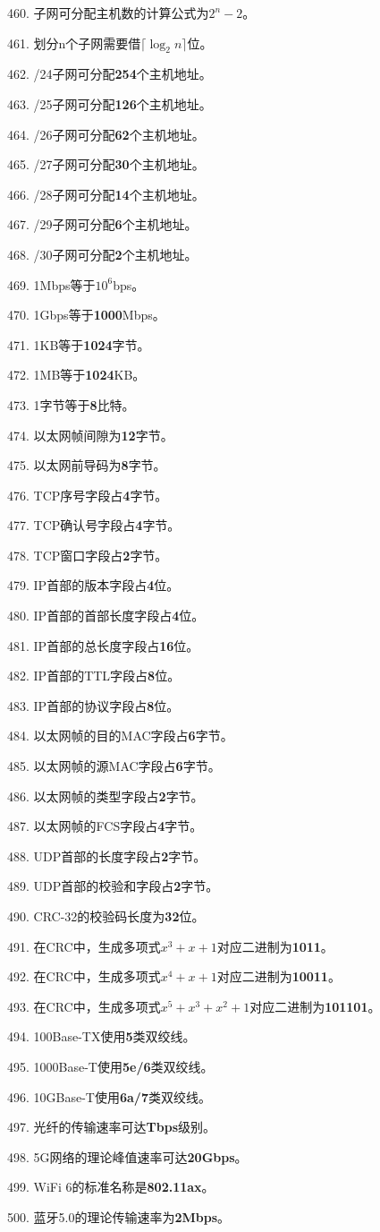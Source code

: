 \documentclass[12pt,a4paper,openany]{ctexbook}
\begin{document}
460. 子网可分配主机数的计算公式为\textbf{$2^n-2$}。

461. 划分n个子网需要借\textbf{$\lceil\log_2 n\rceil$}位。

462. /24子网可分配\textbf{254}个主机地址。

463. /25子网可分配\textbf{126}个主机地址。

464. /26子网可分配\textbf{62}个主机地址。

465. /27子网可分配\textbf{30}个主机地址。

466. /28子网可分配\textbf{14}个主机地址。

467. /29子网可分配\textbf{6}个主机地址。

468. /30子网可分配\textbf{2}个主机地址。

469. 1Mbps等于\textbf{$10^6$}bps。

470. 1Gbps等于\textbf{1000}Mbps。

471. 1KB等于\textbf{1024}字节。

472. 1MB等于\textbf{1024}KB。

473. 1字节等于\textbf{8}比特。

474. 以太网帧间隙为\textbf{12}字节。

475. 以太网前导码为\textbf{8}字节。

476. TCP序号字段占\textbf{4}字节。

477. TCP确认号字段占\textbf{4}字节。

478. TCP窗口字段占\textbf{2}字节。

479. IP首部的版本字段占\textbf{4}位。

480. IP首部的首部长度字段占\textbf{4}位。

481. IP首部的总长度字段占\textbf{16}位。

482. IP首部的TTL字段占\textbf{8}位。

483. IP首部的协议字段占\textbf{8}位。

484. 以太网帧的目的MAC字段占\textbf{6}字节。

485. 以太网帧的源MAC字段占\textbf{6}字节。

486. 以太网帧的类型字段占\textbf{2}字节。

487. 以太网帧的FCS字段占\textbf{4}字节。

488. UDP首部的长度字段占\textbf{2}字节。

489. UDP首部的校验和字段占\textbf{2}字节。

490. CRC-32的校验码长度为\textbf{32}位。

491. 在CRC中，生成多项式$x^3+x+1$对应二进制为\textbf{1011}。

492. 在CRC中，生成多项式$x^4+x+1$对应二进制为\textbf{10011}。

493. 在CRC中，生成多项式$x^5+x^3+x^2+1$对应二进制为\textbf{101101}。

494. 100Base-TX使用\textbf{5}类双绞线。

495. 1000Base-T使用\textbf{5e/6}类双绞线。

496. 10GBase-T使用\textbf{6a/7}类双绞线。

497. 光纤的传输速率可达\textbf{Tbps}级别。

498. 5G网络的理论峰值速率可达\textbf{20Gbps}。

499. WiFi 6的标准名称是\textbf{802.11ax}。

500. 蓝牙5.0的理论传输速率为\textbf{2Mbps}。
\end{document}
